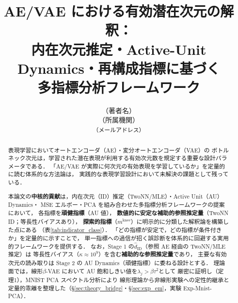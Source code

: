 \documentclass[11pt,a4paper]{jsarticle}
\title{AE/VAE における有効潜在次元の解釈：\\
       内在次元推定・Active-Unit Dynamics・再構成指標に基づく\\
       多指標分析フレームワーク}
\author{（著者名）\\
{\small （所属機関）}\\
{\small \texttt{（メールアドレス）}}}
\date{}
\newcommand{\kap}{\kappa}
\newcommand{\mknee}{m^{\mathrm{knee}}}
\begin{document}
\maketitle

\begin{abstract}
表現学習においてオートエンコーダ（AE）・変分オートエンコーダ（VAE）の
ボトルネック次元は，学習された潜在表現が利用する有効次元数を規定する重要な設計パラメータである．
「AE/VAE が実際に何次元の有効表現を学習しているか」を定量的に読む体系的な方法論は，
実践的な表現学習設計において未解決の課題として残っている．

本論文の\textbf{中核的貢献}は，内在次元（ID）推定（TwoNN/MLE）・Active Unit（AU）Dynamics・
MSE エルボー・PCA を組み合わせた多指標分析フレームワークの提案において，
各指標を\textbf{頑健指標}（AU 値），
\textbf{数値的に安定な補助的参照推定量}（TwoNN ID；等長性バイアスあり），
\textbf{探索的指標}（$\mknee$）に明示的に分類した解釈論を構築した点にある
（表\ref{tab:indicator_class}）．
「どの指標が安定で，どの指標が条件付きか」を定量的に示すことで，
単一指標への過信が招く誤診断を体系的に回避する実用的フレームワークを提供する．
なお，Stage 1 の$\hat{d}_\mathrm{ID}$（参照 AE 経由の TwoNN/MLE 推定）は
等長性バイアス（$\kap \approx 10^9$）を含む\textbf{補助的な参照推定量}であり，
主要な有効次元の読み取りは Stage 2 の AU Dynamics（頑健指標）に委ねる設計とする．
理論面では，線形$\beta$-VAE において AU 飽和しきい値を$\lambda_j > \beta\tau^2$として
厳密に証明し（定理1），MNIST PCA スペクトル分析により
線形理論から非線形実験への定性的継承と定量的乖離を整理した（§\ref{sec:theory_bridge}・§\ref{sec:exp_em}，実験 Exp-Mnist-PCA）．


\end{abstract}
\end{document}
